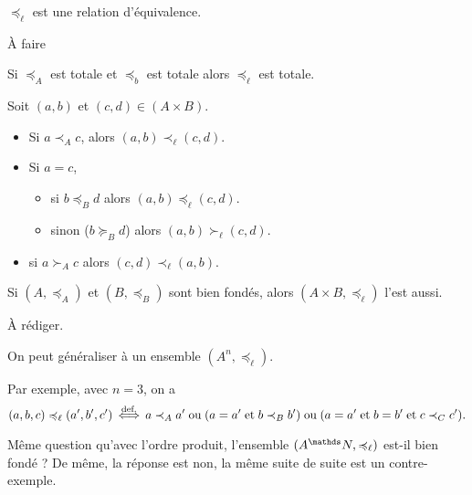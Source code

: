\begin{prop}
	$\preceq_\ell$\/ est une relation d'équivalence.
\end{prop}

\begin{prv}
	À faire
\end{prv}

\begin{prop}
	Si $\preceq_A$\/ est totale et $\preceq_b$\/ est totale alors $\preceq_\ell$\/ est totale.
\end{prop}

\begin{prv}
	Soit $(a,b)$\/ et $(c,d) \in (A \times B)$.

	\begin{itemize}
		\item Si $a \prec_A c$, alors $(a,b) \prec_\ell (c,d)$.
		\item Si $a = c$,
			\begin{itemize}
				\item si $b \preceq_B d$\/ alors $(a,b) \preceq_\ell (c,d)$.
				\item sinon ($b \succeq_B d$) alors $(a,b) \succ_\ell (c,d)$.
			\end{itemize}
		\item si $a \succ_A c$\/ alors $(c,d) \prec_\ell (a,b)$.
	\end{itemize}
\end{prv}

\begin{prop}
	Si $(A, \preceq_A)$\/ et $(B, \preceq_B)$\/ sont bien fondés, alors $(A \times B, \preceq_\ell)$\/ l'est aussi.
\end{prop}

\begin{prv}
	À rédiger.
\end{prv}

\begin{rmk}
	On peut généraliser à un ensemble $(A^n, \preceq_\ell)$.

	Par exemple, avec $n = 3$, on a \[
		(a,b,c) \preccurlyeq_\ell (a', b', c') \mathop{\iff}^{\text{def.}} a \prec_A a' \mathrel{\text{ou}} (a = a' \mathrel{\text{et}} b \prec_B b') \mathrel{\text{ou}} (a = a' \mathrel{\text{et}} b = b' \mathrel{\text{et}} c \prec_C c')
	.\]
\end{rmk}

Même question qu'avec l'ordre produit, l'ensemble $(A^\N, \preceq_\ell)$\/ est-il bien fondé ? De même, la réponse est non, la même suite de suite est un contre-exemple.

